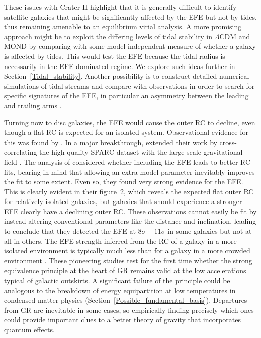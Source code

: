 \documentclass[fleqn,usenatbib,useAMS]{mnras} %
\begin{document}
These issues with Crater II highlight that it is generally difficult to identify satellite galaxies that might be significantly affected by the EFE but not by tides, thus remaining amenable to an equilibrium virial analysis. A more promising approach might be to exploit the differing levels of tidal stability in $\Lambda$CDM and MOND by comparing with some model-independent measure of whether a galaxy is affected by tides. This would test the EFE because the tidal radius is necessarily in the EFE-dominated regime. We explore such ideas further in Section~\ref{Tidal_stability}. Another possibility is to construct detailed numerical simulations of tidal streams and compare with observations in order to search for specific signatures of the EFE, in particular an asymmetry between the leading and trailing arms \citep[Section~\ref{Tidal_streams}; see also][]{Thomas_2018}.

Turning now to disc galaxies, the EFE would cause the outer RC to decline, even though a flat RC is expected for an isolated system. Observational evidence for this was found by \citet{Haghi_2016}. In a major breakthrough, \citet{Chae_2020_EFE} extended their work by cross-correlating the high-quality SPARC dataset with the large-scale gravitational field \citep{Desmond_2018}. The analysis of \citet{Chae_2020_EFE} considered whether including the EFE leads to better RC fits, bearing in mind that allowing an extra model parameter inevitably improves the fit to some extent. Even so, they found very strong evidence for the EFE. This is clearly evident in their figure~2, which reveals the expected flat outer RC for relatively isolated galaxies, but galaxies that should experience a stronger EFE clearly have a declining outer RC. These observations cannot easily be fit by instead altering conventional parameters like the distance and inclination, leading \citet{Chae_2020_EFE} to conclude that they detected the EFE at $8\sigma-11\sigma$ in some galaxies but not at all in others. The EFE strength inferred from the RC of a galaxy in a more isolated environment is typically much less than for a galaxy in a more crowded environment \citep{Chae_2021}. These pioneering studies test for the first time whether the strong equivalence principle at the heart of GR remains valid at the low accelerations typical of galactic outskirts. A significant failure of the principle could be analogous to the breakdown of energy equipartition at low temperatures in condensed matter physics (Section~\ref{Possible_fundamental_basis}). Departures from GR are inevitable in some cases, so empirically finding precisely which ones could provide important clues to a better theory of gravity that incorporates quantum effects.
\end{document}
